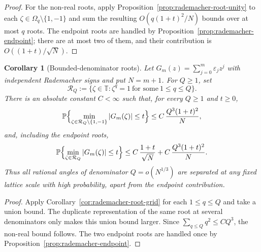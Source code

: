 \documentclass[11pt]{amsart}
\numberwithin{equation}{section}
\newtheorem{corollary}[theorem]{Corollary}
\theoremstyle{definition}
\theoremstyle{remark}
\newcommand{\T}{\mathbb T}
\newcommand{\Prob}{\mathbb P}
\newcommand{\abs}[1]{\left\lvert #1\right\rvert}
\begin{document}
\begin{proof}
For the non-real roots, apply Proposition~\ref{prop:rademacher-root-unity} to
each \(\zeta\in\Omega_q\setminus\{1,-1\}\) and sum the resulting
\(O(q(1+t)^2/N)\) bounds over at most \(q\) roots.  The endpoint roots are
handled by Proposition~\ref{prop:rademacher-endpoint}; there are at most two of
them, and their contribution is \(O((1+t)/\sqrt N)\).
\end{proof}

\begin{corollary}[Bounded-denominator roots]\label{cor:rademacher-denom-grid}
Let \(G_m(z)=\sum_{j=0}^m\varepsilon_jz^j\) with independent Rademacher signs
and put \(N=m+1\).  For \(Q\ge1\), set
\[
  \mathcal R_Q:=\{\zeta\in\T:\zeta^q=1\ \text{for some}\ 1\le q\le Q\}.
\]
There is an absolute constant \(C<\infty\) such that, for every \(Q\ge1\) and
\(t\ge0\),
\[
  \Prob\Bigl\{\min_{\zeta\in\mathcal R_Q\setminus\{1,-1\}}\abs{G_m(\zeta)}
       \le t\Bigr\}
  \le C\,\frac{Q^3(1+t)^2}{N},
\]
and, including the endpoint roots,
\[
  \Prob\Bigl\{\min_{\zeta\in\mathcal R_Q}\abs{G_m(\zeta)}\le t\Bigr\}
  \le C\,\frac{1+t}{\sqrt N}
      +C\,\frac{Q^3(1+t)^2}{N}.
\]
Thus all rational angles of denominator \(Q=o(N^{1/3})\) are separated at any
fixed lattice scale with high probability, apart from the endpoint contribution.
\end{corollary}

\begin{proof}
Apply Corollary~\ref{cor:rademacher-root-grid} for each \(1\le q\le Q\) and
take a union bound.  The duplicate representation of the same root at several
denominators only makes this union bound larger.  Since
\(\sum_{q\le Q}q^2\le C Q^3\), the non-real bound follows.  The two endpoint
roots are handled once by Proposition~\ref{prop:rademacher-endpoint}.
\end{proof}
\end{document}
